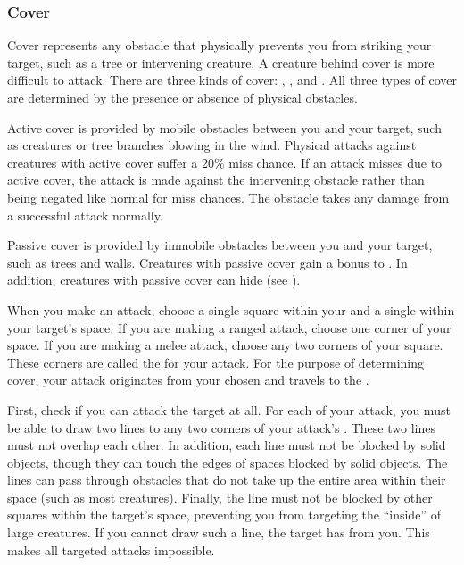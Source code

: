         \subsubsection{Cover}\label{Cover}

            Cover represents any obstacle that physically prevents you from striking your target, such as a tree or intervening creature.
            A creature behind cover is more difficult to attack.
            There are three kinds of cover: , , and .
            All three types of cover are determined by the presence or absence of physical obstacles.

            \label{Active Cover} Active cover is provided by mobile obstacles between you and your target, such as creatures or tree branches blowing in the wind.
            Physical attacks against creatures with active cover suffer a 20\% miss chance.
            If an attack misses due to active cover, the attack is made against the intervening obstacle rather than being negated like normal for miss chances.
            The obstacle takes any damage from a successful attack normally.

            \label{Passive Cover} Passive cover is provided by immobile obstacles between you and your target, such as trees and walls.
            Creatures with passive cover gain a  bonus to .
            In addition, creatures with passive cover can hide (see ).


            When you make an attack, choose a single square within your  and a single  within your target's space.
            If you are making a ranged attack, choose one corner of your space.
            If you are making a melee attack, choose any two corners of your square.
            These corners are called the  for your attack.
            For the purpose of determining cover, your attack originates from your chosen  and travels to the .

            First, check if you can attack the target at all.
            For each  of your attack, you must be able to draw two lines to any two corners of your attack's .
            These two lines must not overlap each other.
            In addition, each line must not be blocked by solid objects, though they can touch the edges of spaces blocked by solid objects.
            The lines can pass through obstacles that do not take up the entire area within their space (such as most creatures).
            Finally, the line must not be blocked by other squares within the target's space, preventing you from targeting the ``inside'' of large creatures.
            If you cannot draw such a line, the target has  from you.
            This makes all targeted attacks impossible.

